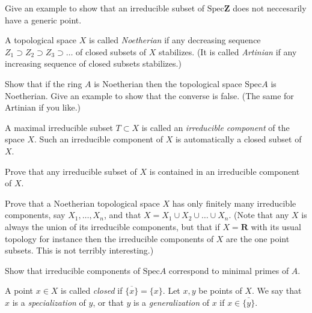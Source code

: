 \begin{exercise}
Give an example to show that an irreducible
subset of $\text{Spec} \mathbf{Z}$ does not neccesarily have a generic point.
\end{exercise}

\begin{definition}
A topological space $X$ is called {\it Noetherian} if any
decreasing sequence $Z_1\supset Z_2 \supset Z_3\supset \ldots$
of closed subsets of $X$ stabilizes.
(It is called {\it Artinian} if any increasing sequence of closed
subsets stabilizes.)
\end{definition}

\begin{exercise}
Show that if the ring $A$ is Noetherian then 
the topological space $\text{Spec} A$ is Noetherian. Give an 
example to show that the converse is false. (The same for
Artinian if you like.)
\end{exercise}

\begin{definition}
A maximal irreducible subset $T\subset X$ is called an
{\it irreducible component} of the space $X$. Such an irreducible
component of $X$ is automatically a closed subset of $X$.
\end{definition}

\begin{exercise}
Prove that any irreducible subset
of $X$ is contained in an irreducible component of $X$.
\end{exercise}

\begin{exercise}
Prove that a Noetherian topological space $X$
has only finitely many irreducible components, say $X_1,\ldots, X_n$,
and that $X=X_1\cup X_2\cup\ldots\cup X_n$. (Note that
any $X$ is always the union of its irreducible components, but that
if $X={\mathbf R}$ with its usual topology for instance then the irreducible
components of $X$ are the one point subsets. This is not
terribly interesting.)
\end{exercise}

\begin{exercise}
Show that irreducible components of $\text{Spec} A$
correspond to minimal primes of $A$.
\end{exercise}

\begin{definition}
A point $x\in X$ is called {\it closed} if $\overline{\{x\}}=\{ x\}$.
Let $x,y$ be points of $X$. We say that $x$ is a {\it specialization}
of $y$, or that $y$ is a {\it generalization} of $x$ if
$x\in \overline{\{y\}}$.
\end{definition}

